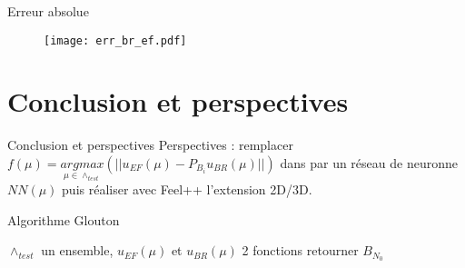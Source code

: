 \documentclass[10pt]{beamer}
\begin{document}
\begin{comment}
Comparons à présent la solution éléments finis avec celle du modèle base réduite. En fixant $\mu$ à 0.05, les résultats obtenus en utilisant la méthode des bases réduites et la méthode éléments finis sont cohérentes. En plus, l'erreur absolue entre les solutions éléments finis et base réduite inférieur à $10^{-3}$ \ref{fig:3}. 
\end{comment}



\begin{frame}{Erreur absolue}

\begin{figure}
\begin{center}
\texttt{[image: err\_br\_ef.pdf]}
\end{center}
\end{figure}


\end{frame}


\section{Conclusion et perspectives}

\begin{frame}{Conclusion et perspectives}
Perspectives : remplacer $f(\mu) = \underset{\mu \in \wedge_{test}}{argmax }(||u_{EF}(\mu) - P_{B_i}u_{BR}(\mu)||)$  dans par un réseau de neuronne $NN(\mu)$ puis réaliser avec Feel++ l'extension 2D/3D. 

\begin{block}{Algorithme Glouton}
\begin{algorithm}
\begin{algorithmic}
\REQUIRE $\wedge_{test}$ un ensemble, $u_{EF}(\mu)$ et $u_{BR}(\mu)$ 2 fonctions
\ENDFOR
\ENSURE retourner $B_{N_0}$ \\
\end{algorithmic}
\end{algorithm}
\end{block}

\end{frame}
\end{document}
